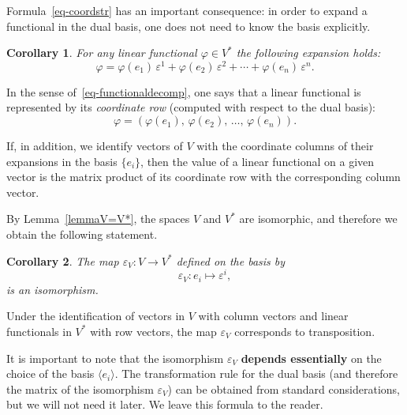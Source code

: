 \documentclass{article}
\newtheorem{corollary}{Corollary}[theorem]
\theoremstyle{definition}
\theoremstyle{definition}
\numberwithin{figure}{section}
\newcommand{\1}{\mathbf{1}}
\begin{document}
Formula~\eqref{eq-coordstr} has an important consequence: in order to expand a functional in the dual basis, one does not need to know the basis explicitly.

\begin{corollary}
For any linear functional $\varphi \in V^*$ the following expansion holds:
\begin{equation}\label{eq-functionaldecomp}
    \varphi = \varphi(e_1)\,\varepsilon^1
            + \varphi(e_2)\,\varepsilon^2
            + \cdots
            + \varphi(e_n)\,\varepsilon^n.
\end{equation}
\end{corollary}

In the sense of~\eqref{eq-functionaldecomp}, one says that a linear functional is represented by its \emph{coordinate row} (computed with respect to the dual basis):
\begin{equation}\label{eq-funct-string}
    \varphi = (\varphi(e_1),\, \varphi(e_2),\, \ldots,\, \varphi(e_n)).
\end{equation}

If, in addition, we identify vectors of $V$ with the coordinate columns of their expansions in the basis $\{e_i\}$, then the value of a linear functional on a given vector is the matrix product of its coordinate row with the corresponding column vector.

\bigskip

By Lemma~\ref{lemmaV=V*}, the spaces $V$ and $V^*$ are isomorphic, and therefore we obtain the following statement.

\begin{corollary}
The map $\varepsilon_V : V \to V^*$ defined on the basis by
\begin{equation}\label{eq-vareps}
    \varepsilon_V : e_i \mapsto \varepsilon^i,
\end{equation}
is an isomorphism.
\end{corollary}

Under the identification of vectors in $V$ with column vectors and linear functionals in $V^*$ with row vectors, the map $\varepsilon_V$ corresponds to transposition.

It is important to note that the isomorphism $\varepsilon_V$ \textbf{depends essentially} on the choice of the basis $\langle e_i \rangle$. The transformation rule for the dual basis (and therefore the matrix of the isomorphism $\varepsilon_V$) can be obtained from standard considerations, but we will not need it later. We leave this formula to the reader.
\end{document}
